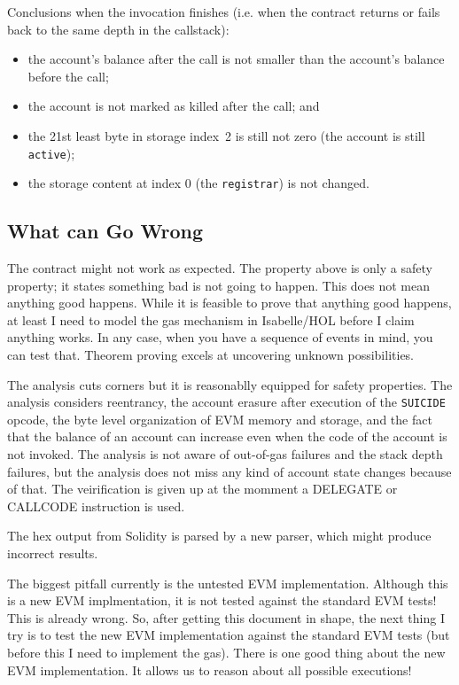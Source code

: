\documentclass[11pt,a4paper]{article}
\begin{document}
Conclusions when the invocation finishes (i.e. when the contract returns or fails back to the same depth in the callstack):
\begin{itemize}
  \item the account's balance after the call is not smaller than the
    account's balance before the call;
  \item the account is not marked as killed after the call; and
  \item the 21st least byte in storage index~2 is still not zero (the account is still \texttt{active});
  \item the storage content at index 0 (the \texttt{registrar}) is not changed.
\end{itemize}


\subsection{What can Go Wrong}

The contract might not work as expected.  The property above is only a safety property; it states something bad is not going to happen.  This does not mean anything good happens.  While it is feasible to prove that anything good happens, at least I need to model the gas mechanism in Isabelle/HOL before I claim anything works.  In any case, when you have a sequence of events in mind, you can test that.  Theorem proving excels at uncovering unknown possibilities.

The analysis cuts corners but it is reasonablly equipped for safety
properties.  The analysis considers reentrancy, the account erasure after execution
of the \texttt{SUICIDE} opcode, the byte level organization of EVM
memory and storage, and the fact that the balance of an account can
increase even when the code of the account is not invoked.
The analysis is not aware of out-of-gas failures and the stack depth
failures, but the analysis does not miss any kind of account state
changes because of that.  The veirification is given up at the momment
a DELEGATE or CALLCODE instruction is used.

The hex output from Solidity is parsed by a new parser, which might produce incorrect results.

The biggest pitfall currently is the untested EVM implementation.
Although this is a new EVM implmentation, it is not
tested against the standard EVM tests!  This is already wrong.
So, after getting this document in shape, the next thing I try is to
test the new EVM implementation against the standard EVM tests (but before this I need to implement the gas).
There is one good thing about the new EVM implementation. It allows us to reason about all possible executions!
\end{document}
